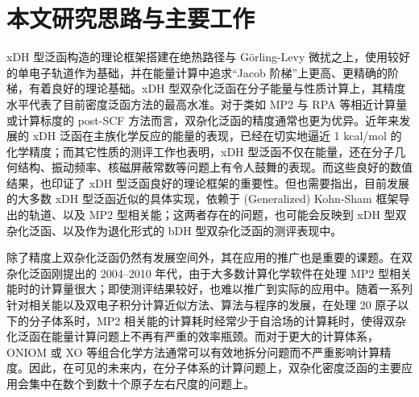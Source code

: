\section{本文研究思路与主要工作}

xDH 型泛函构造的理论框架搭建在绝热路径与 G\"{o}rling-Levy 微扰之上，使用较好的单电子轨道作为基础，并在能量计算中追求“Jacob 阶梯”上更高、更精确的阶梯，有着良好的理论基础。xDH 型双杂化泛函在分子能量与性质计算上，其精度水平代表了目前密度泛函方法的最高水准。对于类如 MP2 与 RPA 等相近计算量或计算标度的 post-SCF 方法而言，双杂化泛函的精度通常也更为优异。近年来发展的 xDH 泛函在主族化学反应的能量的表现，已经在切实地逼近 1 kcal/mol 的化学精度；而其它性质的测评工作也表明，xDH 型泛函不仅在能量，还在分子几何结构、振动频率、核磁屏蔽常数等问题上有令人鼓舞的表现。而这些良好的数值结果，也印证了 xDH 型泛函良好的理论框架的重要性。但也需要指出，目前发展的大多数 xDH 型泛函近似的具体实现，依赖于 (Generalized) Kohn-Sham 框架导出的轨道、以及 MP2 型相关能；这两者存在的问题，也可能会反映到 xDH 型双杂化泛函、以及作为退化形式的 bDH 型双杂化泛函的测评表现中。

除了精度上双杂化泛函仍然有发展空间外，其在应用的推广也是重要的课题。在双杂化泛函刚提出的 2004--2010 年代，由于大多数计算化学软件在处理 MP2 型相关能时的计算量很大；即使测评结果较好，也难以推广到实际的应用中。随着一系列针对相关能以及双电子积分计算近似方法、算法与程序的发展，在处理 20 原子以下的分子体系时，MP2 相关能的计算耗时经常少于自洽场的计算耗时，使得双杂化泛函在能量计算问题上不再有严重的效率瓶颈。而对于更大的计算体系，ONIOM 或 XO 等组合化学方法通常可以有效地拆分问题而不严重影响计算精度\cite{Guo-Xu.JCC.2012, Chen-Xu.JCTC.2020, Chen-Xu.NC.2023}。因此，在可见的未来内，在分子体系的计算问题上，双杂化密度泛函的主要应用会集中在数个到数十个原子左右尺度的问题上。


